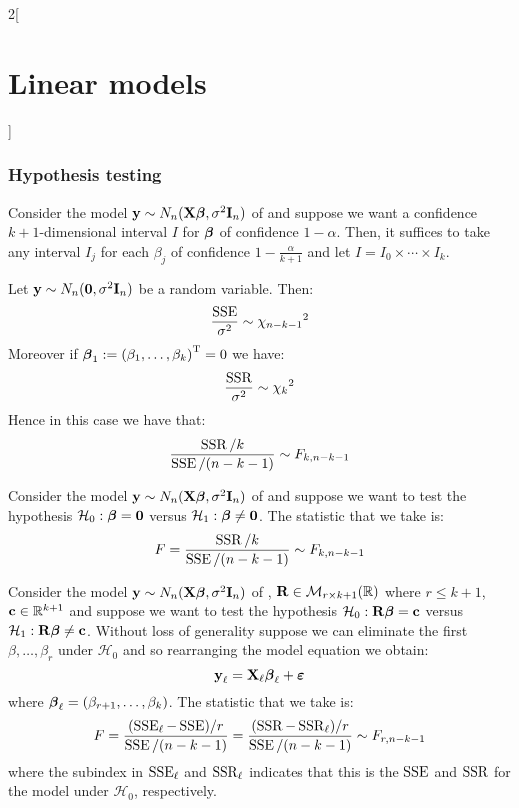 \documentclass[../../../main_math.tex]{subfiles}
\begin{document}
\begin{multicols}{2}[\section{Linear models}]
  \subsubsection{Hypothesis testing}
  \begin{proposition}
    Consider the model $\boldsymbol{\mathrm{y}}\sim N_n(\boldsymbol{\mathrm{X\beta}},\sigma^2\boldsymbol{\mathrm{I}}_n)$ of  and suppose we want a confidence $k+1$-dimensional interval $I$ for $\boldsymbol{\mathrm{\beta}}$ of confidence $1-\alpha$. Then, it suffices to take any interval $I_j$ for each $\beta_j$ of confidence $1-\frac{\alpha}{k+1}$ and let $I=I_0\times\cdots\times I_{k}$.
  \end{proposition}
  \begin{theorem}
    Let $\boldsymbol{\mathrm{y}}\sim N_n(\boldsymbol{\mathrm{0}},\sigma^2\boldsymbol{\mathrm{I}}_n)$ be a random variable. Then:
    $$\frac{\operatorname{SSE}}{\sigma^2}\sim{\chi_{n-k-1}}^2$$
    Moreover if $\boldsymbol{\mathrm{\beta}}_1:={(\beta_1,\ldots,\beta_k)}^{\mathrm{T}}=0$ we have:
    $$\frac{\operatorname{SSR}}{\sigma^2}\sim{\chi_{k}}^2$$
    Hence in this case we have that: $$\frac{\operatorname{SSR}/ k}{\operatorname{SSE}/(n-k-1)}\sim F_{k,n-k-1}$$
  \end{theorem}
  \begin{proposition}
    Consider the model $\boldsymbol{\mathrm{y}}\sim N_n(\boldsymbol{\mathrm{X\beta}},\sigma^2\boldsymbol{\mathrm{I}}_n)$ of  and suppose we want to test the hypothesis $\mathcal{H}_0:\boldsymbol{\mathrm{\beta}}=\boldsymbol{\mathrm{0}}$ versus $\mathcal{H}_1:\boldsymbol{\mathrm{\beta}}\ne\boldsymbol{\mathrm{0}}$. The statistic that we take is: $$F=\frac{\operatorname{SSR}/ k}{\operatorname{SSE}/(n-k-1)}\sim F_{k,n-k-1}$$
  \end{proposition}
  \begin{proposition}
    Consider the model $\boldsymbol{\mathrm{y}}\sim N_n(\boldsymbol{\mathrm{X\beta}},\sigma^2\boldsymbol{\mathrm{I}}_n)$ of , $\boldsymbol{\mathrm{R}}\in\mathcal{M}_{r\times {k+1}}(\mathbb{R})$ where $r\leq k+1$, $\boldsymbol{\mathrm{c}}\in\mathbb{R}^{k+1}$ and suppose we want to test the hypothesis $\mathcal{H}_0:\boldsymbol{\mathrm{R}}\boldsymbol{\mathrm{\beta}}=\boldsymbol{\mathrm{c}}$ versus $\mathcal{H}_1:\boldsymbol{\mathrm{R}}\boldsymbol{\mathrm{\beta}}\ne\boldsymbol{\mathrm{c}}$.
    Without loss of generality suppose we can eliminate the first $\beta,\ldots,\beta_r$ under $\mathcal{H}_0$ and so rearranging the model equation we obtain:
    $$\boldsymbol{\mathrm{y}}_\ell=\boldsymbol{\mathrm{X}}_\ell\boldsymbol{\mathrm{\beta}}_\ell+\boldsymbol{\mathrm{\varepsilon}}$$
    where $\boldsymbol{\mathrm{\beta}}_\ell=(\beta_{r+1},\ldots,\beta_k)$. The statistic that we take is:
    \begin{equation}\label{LM:hypothesisgen}
      F=\frac{(\operatorname{SSE}_\ell-\operatorname{SSE})/ r}{\operatorname{SSE}/(n-k-1)}=\frac{(\operatorname{SSR}-\operatorname{SSR}_\ell)/ r}{\operatorname{SSE}/(n-k-1)}\sim F_{r,n-k-1}
    \end{equation}
    where the subindex in $\operatorname{SSE}_\ell$ and $\operatorname{SSR}_\ell$ indicates that this is the $\operatorname{SSE}$ and $\operatorname{SSR}$ for the model under $\mathcal{H}_0$, respectively.
  \end{proposition}

\end{multicols}
\end{document}
